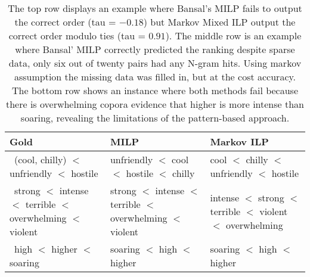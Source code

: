 \documentclass[11pt,letterpaper]{article}
\begin{document}
\begin{table}
\small
\centering
\begin{tabular}{|l|l|l|}
% 
\hline 
\bf Gold & \bf MILP & \bf Markov ILP \\
\hline
% 
\ \pbox{20cm}{(cool, chilly) \\ $<$ unfriendly \\ $<$ hostile } 
& \pbox{20cm}{unfriendly \\ $<$ cool \\ $<$ hostile \\ $<$ chilly }
& \pbox{20cm}{cool \\ $<$ chilly \\ $<$ unfriendly \\ $<$ hostile } \\
% 
\hline
% 
\ \pbox{20cm}{strong \\ $<$ intense \\ $<$ terrible \\ $<$ overwhelming \\ $<$ violent } 
& \pbox{20cm}{strong \\ $<$ intense \\ $<$ terrible \\ $<$ overwhelming \\ $<$ violent }
& \pbox{20cm}{intense \\ $<$ strong \\ $<$ terrible \\ $<$ violent \\ $<$ overwhelming } \\
% 
\hline
% 
\ \pbox{20cm}{high \\ $<$ higher \\ $<$ soaring }
& \pbox{20cm}{soaring \\ $<$ high \\ $<$ higher \\ }
& \pbox{20cm}{soaring \\ $<$ high \\ $<$ higher \\ }\\
% 
\hline
\end{tabular}
\caption{\label{font-table} The top row displays an example where Bansal's MILP fails to output the correct order (tau = $-0.18$) but Markov Mixed ILP output the correct order modulo ties (tau = $0.91$). The middle row is an example where Bansal' MILP correctly predicted the ranking despite sparse data, only six out of twenty pairs had any N-gram hits. Using markov assumption the missing data was filled in, but at the cost accuracy. The bottom row shows an instance where both methods fail because there is overwhelming copora evidence that higher is more intense than soaring, revealing the limitations of the pattern-based approach.}
\end{table}
\end{document}
